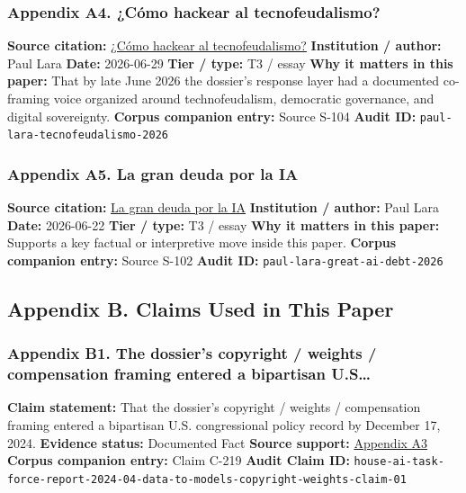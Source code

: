 \documentclass[
  american,
  11pt,
  letterpaper,
]{article}
\begin{document}
\subsubsection{Appendix A4. ¿Cómo hackear al
tecnofeudalismo?}\label{appendix-a4-c-mo-hackear-al-tecnofeudalismo}

\textbf{Source citation:}
\href{https://www.dineroenimagen.com/paul-lara/como-hackear-al-tecnofeudalismo/186955}{¿Cómo
hackear al tecnofeudalismo?} \textbf{Institution / author:} Paul Lara
\textbf{Date:} 2026-06-29 \textbf{Tier / type:} T3 / essay \textbf{Why
it matters in this paper:} That by late June 2026 the dossier's response
layer had a documented co-framing voice organized around
technofeudalism, democratic governance, and digital sovereignty.
\textbf{Corpus companion entry:} Source S-104 \textbf{Audit ID:}
\texttt{paul-lara-tecnofeudalismo-2026}

\subsubsection{Appendix A5. La gran deuda por la
IA}\label{appendix-a5-la-gran-deuda-por-la-ia}

\textbf{Source citation:}
\href{https://www.dineroenimagen.com/paul-lara/la-gran-deuda-por-la-ia/186930}{La
gran deuda por la IA} \textbf{Institution / author:} Paul Lara
\textbf{Date:} 2026-06-22 \textbf{Tier / type:} T3 / essay \textbf{Why
it matters in this paper:} Supports a key factual or interpretive move
inside this paper. \textbf{Corpus companion entry:} Source S-102
\textbf{Audit ID:} \texttt{paul-lara-great-ai-debt-2026}

\subsection{Appendix B. Claims Used in This
Paper}\label{appendix-b.-claims-used-in-this-paper}

\subsubsection{Appendix B1. The dossier's copyright / weights /
compensation framing entered a bipartisan
U.S\ldots{}}\label{appendix-b1-the-dossier-s-copyright-weights-compensation-framing-entered-a-bipartisan-u-s}

\textbf{Claim statement:} That the dossier's copyright / weights /
compensation framing entered a bipartisan U.S. congressional policy
record by December 17, 2024. \textbf{Evidence status:} Documented Fact
\textbf{Source support:}
\hyperref[appendix-a3-bipartisan-house-task-force-report-on-artificial-intelligence]{Appendix
A3} \textbf{Corpus companion entry:} Claim C-219 \textbf{Audit Claim
ID:}
\texttt{house-ai-task-force-report-2024-04-data-to-models-copyright-weights-claim-01}
\end{document}
